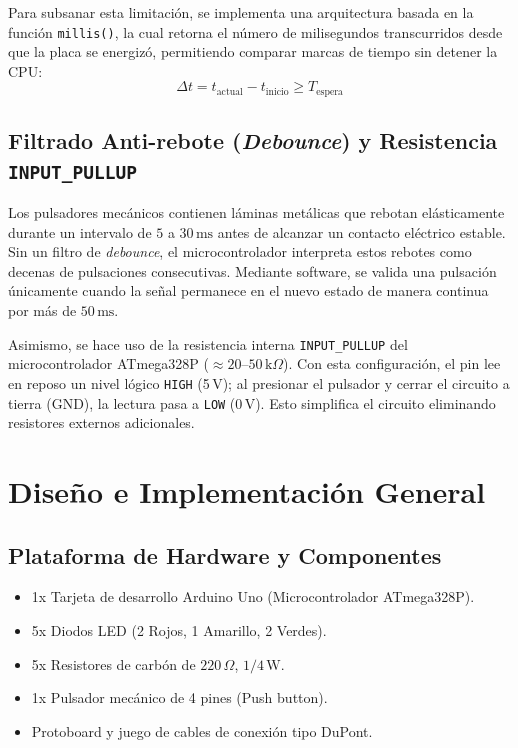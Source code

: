 \documentclass[12pt,a4paper]{article}
\begin{document}
Para subsanar esta limitación, se implementa una arquitectura basada en la función \texttt{millis()}, la cual retorna el número de milisegundos transcurridos desde que la placa se energizó, permitiendo comparar marcas de tiempo sin detener la CPU:
\begin{equation}
    \Delta t = t_{\text{actual}} - t_{\text{inicio}} \ge T_{\text{espera}}
\end{equation}

\subsection{Filtrado Anti-rebote (\textit{Debounce}) y Resistencia \texttt{INPUT\_PULLUP}}
Los pulsadores mecánicos contienen láminas metálicas que rebotan elásticamente durante un intervalo de $5$ a $30\,\text{ms}$ antes de alcanzar un contacto eléctrico estable. Sin un filtro de \textit{debounce}, el microcontrolador interpreta estos rebotes como decenas de pulsaciones consecutivas. Mediante software, se valida una pulsación únicamente cuando la señal permanece en el nuevo estado de manera continua por más de $50\,\text{ms}$.

Asimismo, se hace uso de la resistencia interna \texttt{INPUT\_PULLUP} del microcontrolador ATmega328P ($\approx 20\text{--}50\,\text{k}\Omega$). Con esta configuración, el pin lee en reposo un nivel lógico \texttt{HIGH} (5\,V); al presionar el pulsador y cerrar el circuito a tierra (GND), la lectura pasa a \texttt{LOW} (0\,V). Esto simplifica el circuito eliminando resistores externos adicionales.

\section{Diseño e Implementación General}

\subsection{Plataforma de Hardware y Componentes}
\begin{itemize}[noitemsep]
    \item 1x Tarjeta de desarrollo Arduino Uno (Microcontrolador ATmega328P).
    \item 5x Diodos LED (2 Rojos, 1 Amarillo, 2 Verdes).
    \item 5x Resistores de carbón de $220\,\Omega$, $1/4\,\text{W}$.
    \item 1x Pulsador mecánico de 4 pines (Push button).
    \item Protoboard y juego de cables de conexión tipo DuPont.
\end{itemize}
\end{document}

